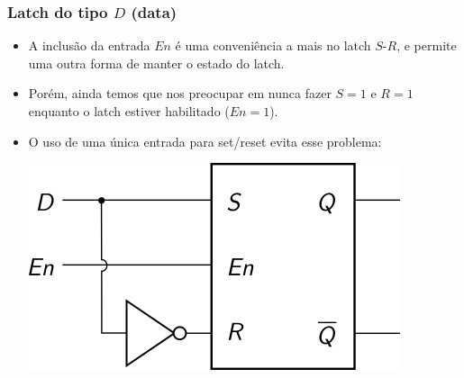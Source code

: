 \documentclass{beamer}
\begin{document}
\begin{frame}
\frametitle{Latch do tipo $D$ (data)}

\begin{itemize}
\item A inclusão da entrada $En$ é uma conveniência a mais no latch $S$-$R$,
      e permite uma outra forma de manter o estado do latch.
\pause
\item Porém, ainda temos que nos preocupar em nunca fazer $S = 1$ e $R = 1$
      enquanto o latch estiver habilitado ($En = 1$).
\pause
\item O uso de uma única entrada para set/reset evita esse problema:\\[12pt]
\begin{center}
\includegraphics{images/latchD}
\end{center}
\end{itemize}
\end{frame}
\end{document}
